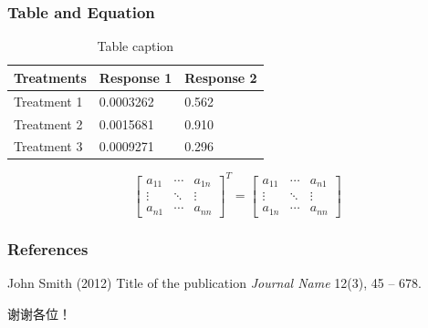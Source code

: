 \documentclass[aspectratio=169]{beamer}
\begin{document}
\begin{frame}
\frametitle{Table and Equation}
\vspace{-0.3cm}
\begin{table}
\caption{Table caption}
\begin{tabular}{l l l}
\toprule
\textbf{Treatments} & \textbf{Response 1} & \textbf{Response 2}\\
\midrule
Treatment 1 & 0.0003262 & 0.562 \\
Treatment 2 & 0.0015681 & 0.910 \\
Treatment 3 & 0.0009271 & 0.296 \\
\bottomrule
\end{tabular}
\end{table}

\begin{equation} %
\label{eq:matrix_transpose}
\left[
\begin{array}{ccc}
a_{11} & \cdots & a_{1n} \\
\vdots & \ddots & \vdots \\
a_{n1} & \cdots & a_{nn}
\end{array}
\right]^T
=
\left[
\begin{array}{ccc}
a_{11} & \cdots & a_{n1} \\
\vdots & \ddots & \vdots \\
a_{1n} & \cdots & a_{nn}
\end{array}
\right]
\end{equation}
\end{frame}


\begin{frame}
\frametitle{References}
\footnotesize{
\begin{thebibliography}{99} %
 John Smith (2012)
\newblock Title of the publication
\newblock \emph{Journal Name} 12(3), 45 -- 678.
\end{thebibliography}
}
\end{frame}

\begin{frame}
谢谢各位！
\end{frame}
\end{document}
